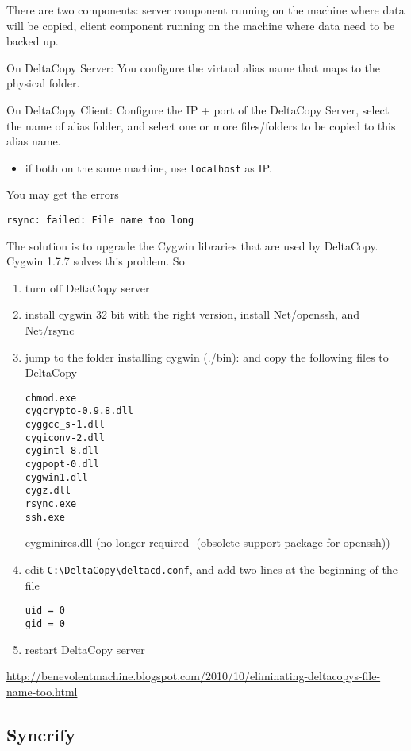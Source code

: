 There are two components: server component running on the machine where data will be copied, client component running on 
the machine where data need to be backed up.

On DeltaCopy Server: You configure the virtual alias name that maps to the physical folder.

On DeltaCopy Client: Configure the IP + port of the DeltaCopy Server, select the name of alias folder, and select one or more files/folders to be copied to this alias name.
\begin{itemize}
  \item if both on the same machine, use \verb!localhost! as IP.
\end{itemize}

You may get the errors
\begin{verbatim}
rsync: failed: File name too long
\end{verbatim} 
The solution is to upgrade the Cygwin libraries that are used by DeltaCopy. Cygwin 1.7.7 solves this problem.
So
\begin{enumerate}
  \item turn off DeltaCopy server
  
  \item install cygwin 32 bit with the right version, install Net/openssh, and Net/rsync
  
  \item jump to the folder installing cygwin (./bin): and copy the following files to DeltaCopy
\begin{verbatim}
chmod.exe
cygcrypto-0.9.8.dll
cyggcc_s-1.dll
cygiconv-2.dll
cygintl-8.dll
cygpopt-0.dll
cygwin1.dll
cygz.dll
rsync.exe
ssh.exe
\end{verbatim}
cygminires.dll (no longer required- (obsolete support package for openssh))

  \item edit \verb!C:\DeltaCopy\deltacd.conf!, and add two lines at the beginning of the file
\begin{verbatim}
uid = 0
gid = 0
\end{verbatim}
  
  \item restart DeltaCopy server
  
\end{enumerate}
\url{http://benevolentmachine.blogspot.com/2010/10/eliminating-deltacopys-file-name-too.html}

\subsection{Syncrify}
\label{sec:Syncrify}

